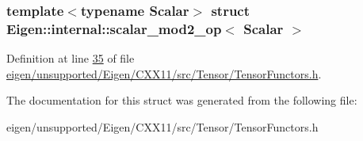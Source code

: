\subsubsection*{template$<$typename Scalar$>$\newline
struct Eigen\+::internal\+::scalar\+\_\+mod2\+\_\+op$<$ Scalar $>$}



Definition at line \hyperlink{eigen_2unsupported_2_eigen_2_c_x_x11_2src_2_tensor_2_tensor_functors_8h_source_l00035}{35} of file \hyperlink{eigen_2unsupported_2_eigen_2_c_x_x11_2src_2_tensor_2_tensor_functors_8h_source}{eigen/unsupported/\+Eigen/\+C\+X\+X11/src/\+Tensor/\+Tensor\+Functors.\+h}.



The documentation for this struct was generated from the following file\+:\begin{DoxyCompactItemize}
\item 
eigen/unsupported/\+Eigen/\+C\+X\+X11/src/\+Tensor/\+Tensor\+Functors.\+h\end{DoxyCompactItemize}
